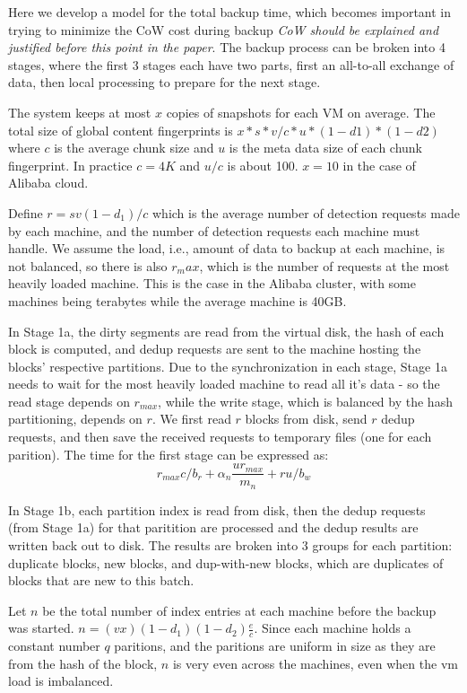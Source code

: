 Here we develop a model for the total backup time, which becomes important in
trying to minimize the CoW cost during backup \emph{CoW should be explained and
justified before this point in the paper}.  The backup process can be broken
into 4 stages, where the first 3 stages each have two parts, first an
all-to-all exchange of
data, then local processing to prepare for the next stage.

The system keeps at most  $ x$ copies of snapshots for each VM on average.  The
total size of  global content fingerprints is $x*s*v/c*u *(1-d1)*(1-d2)$ where
$c$ is the average chunk size and $u$ is the meta data size of each chunk
fingerprint. In practice $c=4K$ and $u/c$  is about 100.  $x=10$ in the case of
Alibaba cloud.

Define $r = s v (1-d_1)/c$  which is the average number of detection
requests made by each machine, and the number of detection requests each
machine must handle.  We assume the load, i.e., amount of data to backup at
each machine, is not balanced, so there is also $r_max$, which is the number of
requests at the most heavily loaded machine. This is the case in the Alibaba
cluster, with some machines being terabytes while the average machine is 40GB.

In Stage 1a, the dirty segments are read from the virtual disk, the hash of
each block is computed, and dedup requests are sent to the machine hosting the
blocks' respective partitions. Due to the synchronization in each stage, Stage
1a needs to wait for the most heavily loaded machine to read all it's data - so
the read stage depends on $r_{max}$, while the write stage, which is balanced
by the hash partitioning, depends on $r$. We first read $r$ blocks from disk,
send $r$ dedup requests, and then save the received requests to temporary files
(one for each parition). The time for the first stage can be expressed as:
\[
    r_{max} c / b_r + \alpha_n\frac{u r_{max}}{m_n} + r u / b_w
\]

In Stage 1b, each partition index is read from disk, then the dedup requests
(from Stage 1a) for that paritition are processed and the dedup results are
written
back out to disk. The results are broken into 3 groups for each partition:
duplicate blocks, new
blocks, and dup-with-new blocks, which are duplicates of blocks that are new to
this batch.

Let $n$ be the total number of index entries at each machine before the backup
was started.  $n=(v x)(1-d_1)(1-d_2)\frac{e}{c}$. Since each machine holds a
constant number $q$ paritions, and the paritions are uniform in size as they
are from the hash of the block, $n$ is very even across the machines, even when
the vm load is imbalanced.

